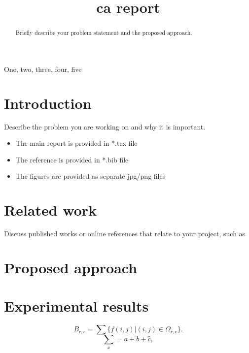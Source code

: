 \documentclass{article}
\title{ca report}
\begin{document}
%
\maketitle
%
\begin{abstract}

Briefly describe your problem statement and the proposed approach.

\end{abstract}
%
\begin{keywords}
One, two, three, four, five
\end{keywords}
%
\section{Introduction}
\label{sec:intro}

Describe the problem you are working on and why it is important.

\begin{itemize}
  \item The main report is provided in *.tex file
  \item The reference is provided in *.bib file
  \item The figures are provided as separate jpg/png files
\end{itemize}


\section{Related work}

Discuss published works or online references that relate to your project, such as \cite{adams1995hitchhiker}

\section{Proposed approach}
\label{sec:proposed approach}


\section{Experimental results}
\label{sec:experimental results}

\begin{equation}\label{equation block model}
B_{r,c}=\sum\{f(i,j)|(i,j)\in \Omega_{r,c}\}.
\end{equation}
\begin{equation}\label{equation 1}
\sum_{x}=a+b+\hat{c},
\end{equation}
\end{document}
